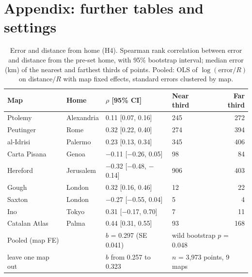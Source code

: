 \documentclass[11pt,a4paper]{article}
\begin{document}
\appendix
\section{Appendix: further tables and settings}
\begin{table}[tbp]\centering\small\caption{Error and distance from home (H4). Spearman rank correlation between error and distance from the pre-set home, with 95\% bootstrap interval; median error (km) of the nearest and farthest thirds of points. Pooled: OLS of $\log(\text{error}/R)$ on distance$/R$ with map fixed effects, standard errors clustered by map.}\label{tab:home}\begin{tabular}{llllr}\toprule Map & Home & $\rho$ [95\% CI] & Near third & Far third\\\midrule
Ptolemy & Alexandria & 0.11 [0.07, 0.16] & 245 & 272\\
Peutinger & Rome & 0.32 [0.22, 0.40] & 274 & 394\\
al-Idrisi & Palermo & 0.23 [0.13, 0.34] & 345 & 406\\
Carta Pisana & Genoa & $-$0.11 [$-$0.26, 0.05] & 98 & 84\\
Hereford & Jerusalem & $-$0.32 [$-$0.48, $-$0.14] & 906 & 403\\
Gough & London & 0.32 [0.16, 0.46] & 12 & 22\\
Saxton & London & $-$0.27 [$-$0.55, 0.04] & 5 & 4\\
Ino & Tokyo & 0.31 [$-$0.17, 0.70] & 7 & 11\\
Catalan Atlas & Palma & 0.44 [0.31, 0.55] & 93 & 168\\
\midrule Pooled (map FE) & & $b$ = 0.297 (SE 0.041) & \multicolumn{2}{l}{wild bootstrap $p$ = 0.048}\\
\quad leave one map out & & $b$ from 0.257 to 0.323 & \multicolumn{2}{l}{$n$ = 3,973 points, 9 maps}\\
\bottomrule\end{tabular}\end{table}
\end{document}
